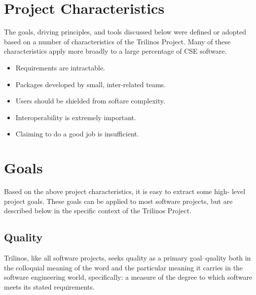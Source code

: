 \documentclass[12pt,relax]{article}
\begin{document}
\section{Project Characteristics}
\label{Section:ProjectCharacteristics}

The goals, driving principles, and tools discussed below were defined or 
adopted based on a number of characteristics of the Trilinos Project.  Many of 
these characteristics apply more broadly to a large percentage of CSE software.

\begin{itemize}

\item Requirements are intractable.



\item Packages developed by small, inter-related teams.

\item Users should be shielded from softare complexity.

\item Interoperability is extremely important.

\item Claiming to do a good job is insufficient.

\end{itemize}


\section{Goals}
\label{Section:Goals}

Based on the above project characteristics, it is easy to extract some high-
level project goals.  These goals can be applied to most software projects,
but are described below in the specific context of the Trilinos Project.

\subsection{Quality}
Trilinos, like all software projects, seeks quality as a primary goal--quality
both in the colloquial meaning of the word and the particular meaning it
carries in the software engineering world, specifically:  a measure of the
degree to which software meets its stated requirements.
\end{document}

